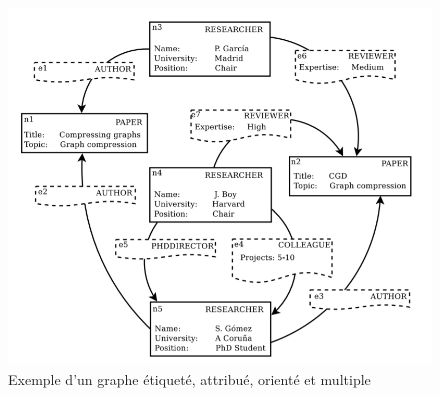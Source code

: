 \begin{figure}[H]
\begin{center}
\includegraphics[height=200 pt, width=280 pt]{./ressources/image/k2-trees-att-graphe.png} 
\end{center}
\caption{Exemple d'un graphe étiqueté, attribué, orienté et multiple}
\label{k2-trees-att-graphe}
\end{figure}

